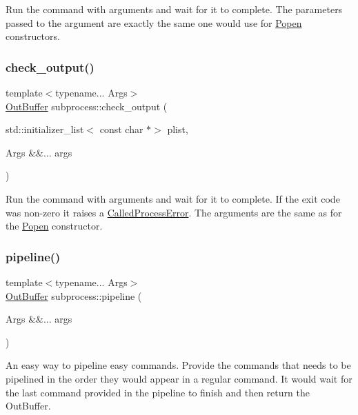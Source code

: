 Run the command with arguments and wait for it to complete. The parameters passed to the argument are exactly the same one would use for \hyperlink{classsubprocess_1_1Popen}{Popen} constructors. \mbox{\label{namespacesubprocess_ab990a3b96997b604c9156843a687552a}} 
\subsubsection{\texorpdfstring{check\+\_\+output()}{check\_output()}}
{\footnotesize\ttfamily template$<$typename... Args$>$ \\
\hyperlink{classsubprocess_1_1Buffer}{Out\+Buffer} subprocess\+::check\+\_\+output (\begin{DoxyParamCaption}\item[{std\+::initializer\+\_\+list$<$ const char $\ast$$>$}]{plist,  }\item[{Args \&\&...}]{args }\end{DoxyParamCaption})}

Run the command with arguments and wait for it to complete. If the exit code was non-\/zero it raises a \hyperlink{classsubprocess_1_1CalledProcessError}{Called\+Process\+Error}. The arguments are the same as for the \hyperlink{classsubprocess_1_1Popen}{Popen} constructor. \mbox{\label{namespacesubprocess_a3c1cdb0eba1dfd9fd8ab48c334b8da59}} 
\subsubsection{\texorpdfstring{pipeline()}{pipeline()}}
{\footnotesize\ttfamily template$<$typename... Args$>$ \\
\hyperlink{classsubprocess_1_1Buffer}{Out\+Buffer} subprocess\+::pipeline (\begin{DoxyParamCaption}\item[{Args \&\&...}]{args }\end{DoxyParamCaption})}

An easy way to pipeline easy commands. Provide the commands that needs to be pipelined in the order they would appear in a regular command. It would wait for the last command provided in the pipeline to finish and then return the Out\+Buffer. 
